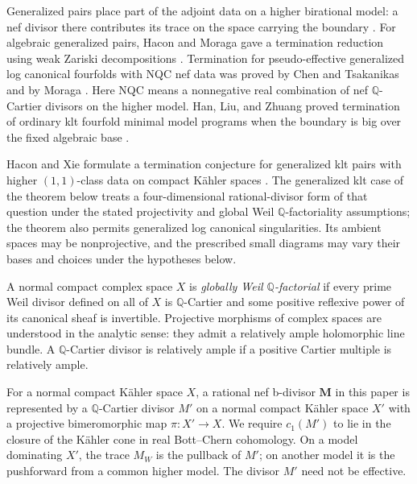 \documentclass[11pt]{amsart}
\theoremstyle{definition}
\theoremstyle{remark}
\numberwithin{equation}{section}
\newcommand{\Q}{\mathbb{Q}}
\newcommand{\M}{\mathbf{M}}
\begin{document}
Generalized pairs place part of the adjoint data on a higher birational model: a nef divisor there contributes its trace on the space carrying the boundary \cite[Definitions~1.4 and 4.1]{BirkarZhang2016}. For algebraic generalized pairs, Hacon and Moraga gave a termination reduction using weak Zariski decompositions \cite[Theorem~1]{HaconMoraga2020}. Termination for pseudo-effective generalized log canonical fourfolds with NQC nef data was proved by Chen and Tsakanikas \cite[Theorem~1.1]{ChenTsakanikas2023} and by Moraga \cite[Theorem~4.4]{Moraga2025}. Here NQC means a nonnegative real combination of nef \(\Q\)-Cartier divisors on the higher model. Han, Liu, and Zhuang proved termination of ordinary klt fourfold minimal model programs when the boundary is big over the fixed algebraic base \cite[Corollary~3.2(3)]{HanLiuZhuang2025}.

Hacon and Xie formulate a termination conjecture for generalized klt pairs with higher \((1,1)\)-class data on compact K\"ahler spaces \cite[Conjecture~1.15]{HaconXie2026}. The generalized klt case of the theorem below treats a four-dimensional rational-divisor form of that question under the stated projectivity and global Weil \(\Q\)-factoriality assumptions; the theorem also permits generalized log canonical singularities. Its ambient spaces may be nonprojective, and the prescribed small diagrams may vary their bases and choices under the hypotheses below.

A normal compact complex space \(X\) is \emph{globally Weil \(\Q\)-factorial} if every prime Weil divisor defined on all of \(X\) is \(\Q\)-Cartier and some positive reflexive power of its canonical sheaf is invertible. Projective morphisms of complex spaces are understood in the analytic sense: they admit a relatively ample holomorphic line bundle. A \(\Q\)-Cartier divisor is relatively ample if a positive Cartier multiple is relatively ample.

For a normal compact K\"ahler space \(X\), a rational nef b-divisor \(\M\) in this paper is represented by a \(\Q\)-Cartier divisor \(M'\) on a normal compact K\"ahler space \(X'\) with a projective bimeromorphic map \(\pi:X'\to X\). We require \(c_1(M')\) to lie in the closure of the K\"ahler cone in real Bott--Chern cohomology. On a model dominating \(X'\), the trace \(M_W\) is the pullback of \(M'\); on another model it is the pushforward from a common higher model. The divisor \(M'\) need not be effective.
\end{document}
